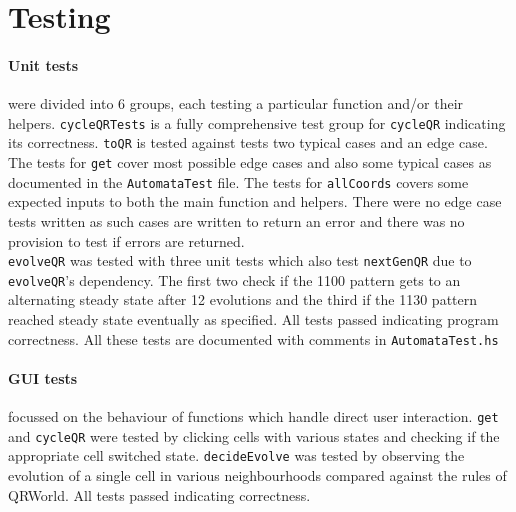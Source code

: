 \documentclass[11pt]{article}
\begin{document}

\section{Testing}%
\paragraph{Unit tests} were divided into 6 groups, each testing a particular function and/or their helpers. \verb|cycleQRTests| is a fully comprehensive test group for \verb|cycleQR| indicating its correctness. \verb|toQR| is tested against tests two typical cases and an edge case. The tests for \verb|get| cover most possible edge cases and also some typical cases as documented in the \verb|AutomataTest| file. The tests for \verb|allCoords| covers some expected inputs to both the main function and helpers. There were no edge case tests written as such cases are written to return an error and there was no provision to test if errors are returned.\\

 \verb|evolveQR| was tested with three unit tests which also test \verb|nextGenQR| due to \verb|evolveQR|'s dependency. The first two check if the 1100 pattern gets to an alternating steady state after 12 evolutions and the third if the 1130 pattern reached steady state eventually as specified. All tests passed indicating program correctness. All these tests are documented with comments in \verb|AutomataTest.hs|
 
\paragraph{GUI tests} focussed on the behaviour of functions which handle direct user interaction. \verb|get| and \verb|cycleQR| were tested by clicking cells with various states and checking if the appropriate cell switched state. \verb|decideEvolve| was tested by observing the evolution of a single cell in various neighbourhoods compared against the rules of QRWorld. All tests passed indicating correctness.
\newpage
\end{document}
